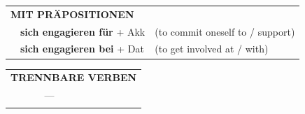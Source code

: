 \documentclass[10pt,a4paper]{revtex4-2}
\begin{document}
\begin{verbbox}
\vspace{10pt}

\begin{tabular}{lll}
\multicolumn{3}{l}{\textbf{MIT PRÄPOSITIONEN}}\\
& \textbf{sich engagieren für} + Akk & (to commit oneself to / support)\\
& \textbf{sich engagieren bei} + Dat & (to get involved at / with)\\
\end{tabular}
\hfill
\begin{tabular}{lll}
\multicolumn{3}{l}{\textbf{TRENNBARE VERBEN}}\\
& ---\\
\vspace{10pt}
\end{tabular}
\vspace{-5pt}

\end{verbbox}
\end{document}

